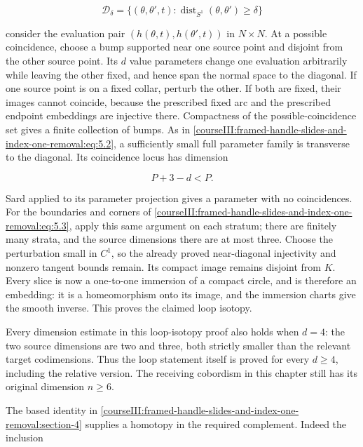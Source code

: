 \begin{equation}
\mathcal D_\delta
  =\{(\theta,\theta',t):
             \operatorname{dist}_{S^1}(\theta,\theta')\geq\delta\}
 \label{courseIII:framed-handle-slides-and-index-one-removal:eq:5.3}
\end{equation}

consider the evaluation pair \((h(\theta,t),h(\theta',t))\) in \(N\times N\). At a possible coincidence, choose a bump supported near one source point and disjoint from the other source point. Its \(d\) value parameters change one evaluation arbitrarily while leaving the other fixed, and hence span the normal space to the diagonal. If one source point is on a fixed collar, perturb the other. If both are fixed, their images cannot coincide, because the prescribed fixed arc and the prescribed endpoint embeddings are injective there. Compactness of the possible-coincidence set gives a finite collection of bumps. As in \eqref{courseIII:framed-handle-slides-and-index-one-removal:eq:5.2}, a sufficiently small full parameter family is transverse to the diagonal. Its coincidence locus has dimension

\begin{equation}
P+3-d<P.
 \label{courseIII:framed-handle-slides-and-index-one-removal:eq:5.4}
\end{equation}

Sard applied to its parameter projection gives a parameter with no coincidences. For the boundaries and corners of \eqref{courseIII:framed-handle-slides-and-index-one-removal:eq:5.3}, apply this same argument on each stratum; there are finitely many strata, and the source dimensions there are at most three. Choose the perturbation small in \(C^1\), so the already proved near-diagonal injectivity and nonzero tangent bounds remain. Its compact image remains disjoint from \(K\). Every slice is now a one-to-one immersion of a compact circle, and is therefore an embedding: it is a homeomorphism onto its image, and the immersion charts give the smooth inverse. This proves the claimed loop isotopy.

Every dimension estimate in this loop-isotopy proof also holds when \(d=4\): the two source dimensions are two and three, both strictly smaller than the relevant target codimensions. Thus the loop statement itself is proved for every \(d\geq4\), including the relative version. The receiving cobordism in this chapter still has its original dimension \(n\geq6\).

The based identity in \cref{courseIII:framed-handle-slides-and-index-one-removal:section-4} supplies a homotopy in the required complement. Indeed the inclusion

